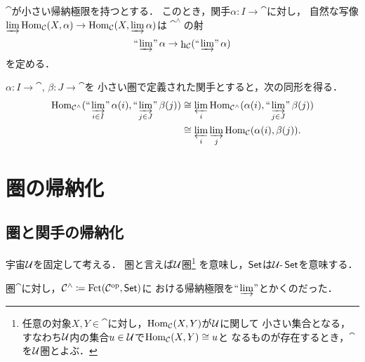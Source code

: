 $\cat$が小さい帰納極限を持つとする．
このとき，関手$\alpha\colon I\to\cat$に対し，
自然な写像$\varinjlim\Hom_{\cat}(X,\alpha)
\to\Hom_\cat(X,\varinjlim\alpha)$は$\cat^\wedge$の射
\begin{equation*}
    \limf\alpha\to\hh_\cat(\limf\alpha)
\end{equation*}
を定める．

$\alpha\colon I\to\cat$, $\beta\colon J\to\cat$を
小さい圏で定義された関手とすると，次の同形を得る．
\begin{equation}
    \begin{aligned}\label{eq:ind-in-U}
        \Hom_{\cat^\wedge}(
            \ind<\varinjlim_{i\in I}>\alpha(i),\ind<\varinjlim_{j\in J}>\beta(j)
            )
        &\cong\varprojlim_i\Hom_{\cat^\wedge}(\alpha(i),\ind<\varinjlim_{j\in J}>\beta(j))\\
        &\cong\varprojlim_i\varinjlim_j\Hom_{\cat}(\alpha(i),\beta(j)).
    \end{aligned}
\end{equation}




























\section{圏の帰納化}

\subsection{圏と関手の帰納化}
宇宙$\U$を固定して考える．
圏と言えば$\U$圏\footnote{
    任意の対象$X,Y\in\cat$に対し，$\Hom_\cat(X,Y)$が$\U$に関して
    小さい集合となる，
    すなわち$\U$内の集合$u\in\U$で$\Hom_\cat(X,Y)\cong u$と
    なるものが存在するとき，$\cat$を$\U$圏とよぶ．
}
を意味し，$\Set$は$\U\text{-}\Set$を意味する．

圏$\cat$に対し，$\cat^\wedge\coloneqq\Fct(\cat^\op,\Set)$に
おける帰納極限を$\limf$とかくのだった．

